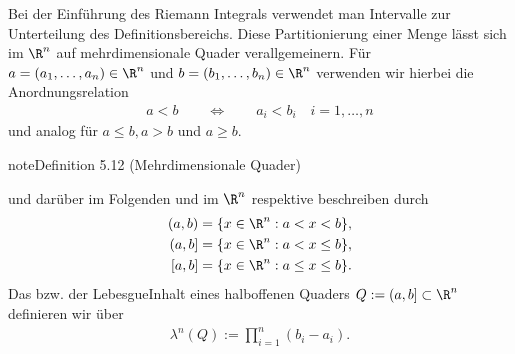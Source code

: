 \documentclass[letterpaper,10pt,german]{jupyterBook}
\begin{document}
\sphinxAtStartPar
Bei der Einführung des Riemann Integrals verwendet man Intervalle zur Unterteilung des Definitionsbereichs.
Diese Partitionierung einer Menge lässt sich im \(\R^n\) auf mehrdimensionale Quader verallgemeinern. Für \(a = (a_1,\ldots,a_n) \in \R^n\) und \(b = (b_1,\ldots,b_n) \in \R^n\) verwenden wir hierbei die Anordnungsrelation
\begin{equation*}
\begin{split}a < b \qquad \Leftrightarrow \qquad a_i < b_i \quad i=1,\ldots,n\end{split}
\end{equation*}
\sphinxAtStartPar
und analog für \(a \leq b, a > b\) und \(a \geq b\).
\label{masstheorie/masstheorie:def:quader}
\begin{sphinxadmonition}{note}{Definition 5.12 (Mehrdimensionale Quader)}



\sphinxAtStartPar
und darüber im Folgenden  und  im \(\R^n\) respektive beschreiben durch
\begin{equation*}
\begin{split}(a,b) &= \lbrace x \in \R^n : a < x < b \rbrace,\\
(a,b] &= \lbrace x \in \R^n : a < x \leq b \rbrace,\\
[a,b] &= \lbrace x \in \R^n : a \leq x \leq b \rbrace.\end{split}
\end{equation*}
\sphinxAtStartPar
Das  bzw. der Lebesgue\sphinxhyphen{}Inhalt eines halboffenen Quaders \(Q := (a,b] \subset \R^n\) definieren wir über
\begin{equation*}
\begin{split}\lambda^n(Q) := \prod_{i=1}^n (b_i - a_i).\end{split}
\end{equation*}\end{sphinxadmonition}
\end{document}
